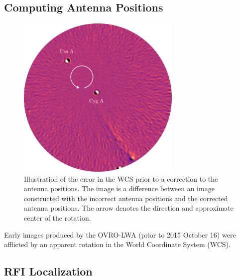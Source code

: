 \begin{bibunit}
\subsection{Computing Antenna Positions}

\begin{figure}
    \centering
    \includegraphics[width=0.7\textwidth]{figures/chapter2/northing-easting-mistake/northing-easting-mistake}
    \caption{
        Illustration of the error in the WCS prior to a correction to the antenna positions. The
        image is a difference between an image constructed with the incorrect antenna positions and
        the corrected antenna positions. The arrow denotes the direction and approximate center of
        the rotation.
    }
    \label{fig:northing-easting-mistake}
\end{figure}

Early images produced by the OVRO-LWA (prior to 2015 October 16) were afflicted by an apparent
rotation in the World Coordinate System (WCS).

\subsection{RFI Localization}


\end{bibunit}

